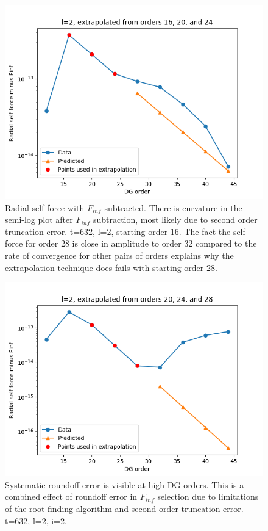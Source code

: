 \begin{figure}
  \includegraphics{extrapolate7t632l2i1}
  \caption{Radial self-force with $F_{inf}$ subtracted. There is curvature in the semi-log plot after $F_{inf}$ subtraction, most likely due to second order truncation error. t=632, l=2, starting order 16. The fact the self force for order 28 is close in amplitude to order 32 compared to the rate of convergence for other pairs of orders explains why the extrapolation technique does fails with starting order 28.}
  \label{truncation}
\end{figure}

\begin{figure}
  \includegraphics{extrapolate7t632l2i2}
  \caption{Systematic roundoff error is visible at high DG orders. This is a combined effect of roundoff error in $F_{inf}$ selection due to limitations of the root finding algorithm and second order truncation error. t=632, l=2, i=2.}
  \label{roundoff}
\end{figure}

